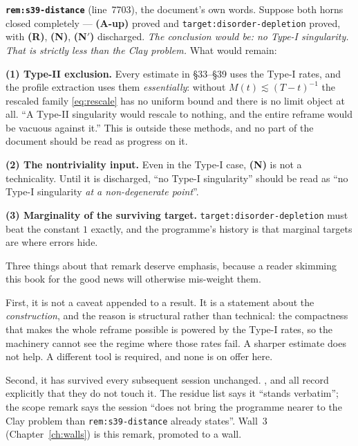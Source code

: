 \begin{record}
\textbf{\texttt{rem:s39-distance}} (line~7703), the document's own words.
Suppose both horns closed completely --- \textbf{(A-up)} proved and
\texttt{target:disorder-depletion} proved, with \textbf{(R)}, \textbf{(N)},
\textbf{(N\('\))} discharged. \emph{The conclusion would be: no Type-I
singularity. That is strictly less than the Clay problem.} What would remain:

\smallskip
\textbf{(1) Type-II exclusion.} Every estimate in \S33--\S39 uses the Type-I
rates, and the profile extraction uses them \emph{essentially}: without
\(M(t)\lesssim(T-t)^{-1}\) the rescaled family \eqref{eq:rescale} has no
uniform bound and there is no limit object at all. ``A Type-II singularity
would rescale to nothing, and the entire reframe would be vacuous against
it.'' This is outside these methods, and no part of the document should be
read as progress on it.

\smallskip
\textbf{(2) The nontriviality input.} Even in the Type-I case, \textbf{(N)} is
not a technicality. Until it is discharged, ``no Type-I singularity'' should
be read as ``no Type-I singularity \emph{at a non-degenerate point}''.

\smallskip
\textbf{(3) Marginality of the surviving target.}
\texttt{target:disorder-depletion} must beat the constant \(1\) exactly, and
the programme's history is that marginal targets are where errors hide.
\end{record}

Three things about that remark deserve emphasis, because a reader skimming
this book for the good news will otherwise mis-weight them.

First, it is not a caveat appended to a result. It is a statement about the
\emph{construction}, and the reason is structural rather than technical: the
compactness that makes the whole reframe possible is powered by the Type-I
rates, so the machinery cannot see the regime where those rates fail. A
sharper estimate does not help. A different tool is required, and none is on
offer here.

Second, it has survived every subsequent session unchanged. ,
 and  all record explicitly that they do not touch it. The
 residue list says it ``stands verbatim''; the  scope remark
says the session ``does not bring the programme nearer to the Clay problem
than \texttt{rem:s39-distance} already states''. Wall~3
(Chapter~\ref{ch:walls}) is this remark, promoted to a wall.

